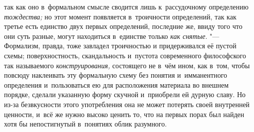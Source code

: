так как оно в~формальном смысле сводится лишь к~рассудочному
определению {\em тождества;}
но этот момент появляется в~троичности определений, так как
третье есть единство двух первых определений, последние же, ввиду того что
они суть разные, могут находиться в~единстве только
{\em как снятые}. "---
Формализм, правда, тоже завладел троичностью и
придерживался её пустой схемы; поверхностность, скандальность и~пустота
современного философского так называемого {\em конструирования,}
состоящего не в~чём ином, как в~том, чтобы повсюду наклеивать
эту формальную схему без понятия и~имманентного определения и~пользоваться
ею для расположения материала во внешнем порядке, сделали указанную форму
скучной и~приобрели ей дурную
славу.
Но из-за безвкусности этого употребления она не может
потерять своей внутренней ценности, и~всё же нужно высоко ценить то, что на
первых порах был найден хотя бы непостигнутый в~понятиях облик разумного.

